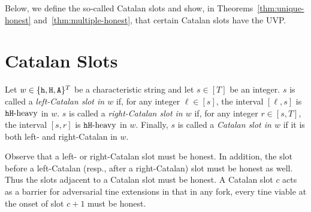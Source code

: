     




Below, we define the so-called Catalan slots and show, 
in Theorems~\ref{thm:unique-honest} and~\ref{thm:multiple-honest}, 
that certain Catalan slots have the UVP.

\section{Catalan Slots}\label{sec:catalan-def}

\begin{definition}
  Let $w \in \{\mathtt{h}, \mathtt{H}, \mathtt{A}\}^T$ be a characteristic string and 
  let $s \in [T]$ be an integer. 
  $s$ is called a \emph{left-Catalan slot in $w$} 
  if, for any integer $\ell \in [s]$, the interval $[\ell, s]$ is $\mathtt{h}\mathtt{H}\text{-heavy}$ in $w$.
  $s$ is called a \emph{right-Catalan slot in $w$} 
  if, for any integer $r \in [s, T]$, the interval $[s, r]$ is $\mathtt{h}\mathtt{H}\text{-heavy}$ in $w$.
  Finally, $s$ is called a \emph{Catalan slot in $w$} if 
  it is both left- and right-Catalan in $w$. 
\end{definition}
Observe that a left- or right-Catalan slot must be honest. 
In addition, the slot before a left-Catalan 
(resp., after a right-Catalan) slot must be honest as well.
Thus the slots adjacent to a Catalan slot must be honest. 
A Catalan slot $c$ acts as a barrier for adversarial tine extensions 
in that in any fork, every tine viable at the onset of slot $c+1$ must be honest. 


